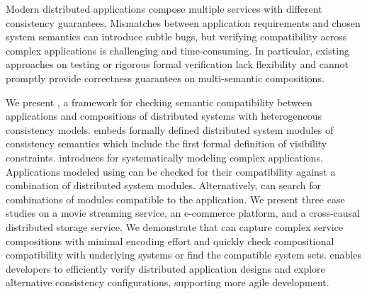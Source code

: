 Modern distributed applications compose multiple services with
different consistency guarantees. Mismatches between application
requirements and chosen system semantics can introduce subtle bugs,
but verifying compatibility across complex applications is
challenging and time-consuming. In particular, existing approaches on
testing or rigorous formal verification lack flexibility and cannot
promptly provide correctness guarantees on multi-semantic compositions.

We present \sysname{}, a framework for checking semantic
compatibility between applications and compositions of distributed
systems with heterogeneous consistency models. \sysname{} embeds
formally defined distributed system modules of
consistency semantics which include the first formal definition of
visibility constraints. \sysname{} introduces \sysgraph{} for
systematically modeling complex applications. Applications modeled
using \sysgraphs{} can be checked for their compatibility against a
combination of distributed system modules. Alternatively, \sysname{}
can search for combinations of modules compatible to the application.
We present three case studies on a movie streaming service, an
e-commerce platform, and a cross-causal distributed storage service.
We demonstrate that \sysname{} can capture complex service compositions
with minimal encoding effort and quickly check compositional compatibility with
underlying systems or find the compatible system sets. \sysname{}
enables developers to efficiently verify distributed application designs
and explore alternative consistency configurations, supporting more
agile development.
